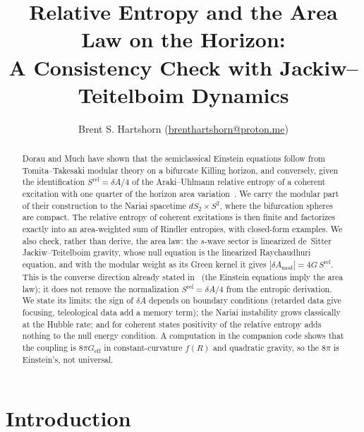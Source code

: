 \documentclass[11pt]{article}
\title{\textbf{Relative Entropy and the Area Law on the \Nariai{} Horizon:}\\ A Consistency Check with Jackiw--Teitelboim Dynamics}
\author{Brent S. Hartshorn \orcidlink{0009-0004-2853-655X} (\url{brenthartshorn@proton.me})}
\newcommand{\Srel}{S^{\mathrm{rel}}}
\begin{document}
\maketitle

\begin{abstract}
Dorau and Much have shown that the semiclassical Einstein equations follow from Tomita--Takesaki modular theory on a bifurcate Killing horizon, and conversely, given the identification $\Srel = \delta A/4$ of the Araki--Uhlmann relative entropy of a coherent excitation with one quarter of the horizon area variation~\cite{DorauMuch}. We carry the modular part of their construction to the Nariai spacetime $dS_2\times S^2$, where the bifurcation spheres are compact. The relative entropy of coherent excitations is then finite and factorizes exactly into an area-weighted sum of Rindler entropies, with closed-form examples. We also check, rather than derive, the area law: the $s$-wave sector is linearized de~Sitter Jackiw--Teitelboim gravity, whose null equation is the linearized Raychaudhuri equation, and with the modular weight as its Green kernel it gives $|\delta A_{\mathrm{mod}}| = 4G\,\Srel$. This is the converse direction already stated in~\cite{DorauMuch} (the Einstein equations imply the area law); it does not remove the normalization $\Srel = \delta A/4$ from the entropic derivation. We state its limits: the sign of $\delta A$ depends on boundary conditions (retarded data give focusing, teleological data add a memory term); the Nariai instability grows classically at the Hubble rate; and for coherent states positivity of the relative entropy adds nothing to the null energy condition. A computation in the companion code shows that the coupling is $8\pi G_{\mathrm{eff}}$ in constant-curvature $f(R)$ and quadratic gravity, so the $8\pi$ is Einstein's, not universal.
\end{abstract}

\section{Introduction}
\label{sec:intro}
\end{document}
